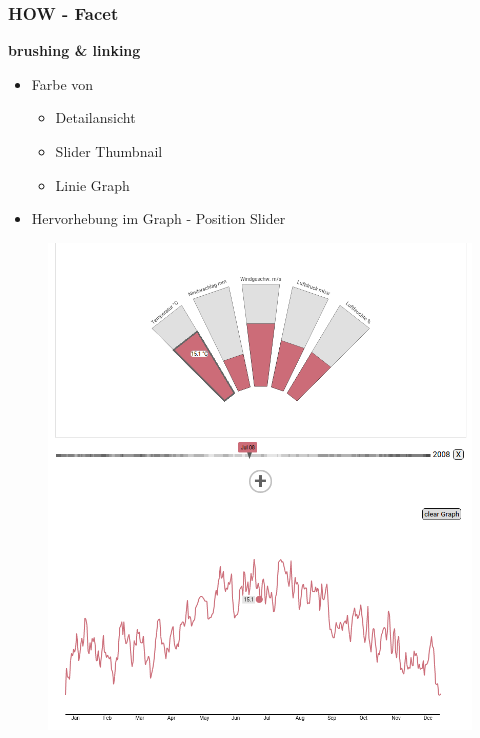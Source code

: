 \documentclass{beamer}
\begin{document}
  \begin{frame}
  \frametitle{HOW - Facet}
    \textbf{brushing \& linking}
    \begin{itemize}
     \item Farbe von
     \begin{itemize}
      \item Detailansicht
      \item Slider Thumbnail
      \item Linie Graph
     \end{itemize}
     \item Hervorhebung im Graph - Position Slider
     \end{itemize}
    \begin{figure}[h]
      \centering
      \includegraphics[width=.3\paperwidth,keepaspectratio=true]{./media/overview_detail.png}
    \end{figure}
  \end{frame}
\end{document}

